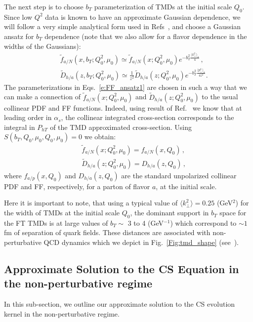 \documentclass[final,3p,times,onecolumn,sort&compress,hidelinks]{elsarticle}
\newcommand{\crd}{\color{red}}
\begin{document}
The next step is to choose $b_T$ parameterization of TMDs at the initial scale $Q_0$.
 Since low $Q^2$ data is known \cite{Schweitzer:2010tt} to have an approximate Gaussian dependence, we will follow a very simple analytical form used in Refs~\cite{Anselmino:2013lza,Signori:2013mda}, and choose a Gaussian ansatz for $b_T$ dependence (note that we also allow for a flavor dependence in the widths of the Gaussians):
\begin{eqnarray}
&&\tilde f_{a/N} (x,b_T; Q_0^2, \mu_0)\simeq  \tilde f_{a/N} (x; Q_0^2, \mu_0) e^{-b_T^2 \frac{\langle k_\perp^2 \rangle_a}{4}}\,,
\nonumber \\[0.3cm]
&&\tilde D_{h/a}(z,b_T; Q_0^2, \mu_0)\simeq \frac{1}{z^2}  \tilde D_{h/a}(z; Q_0^2, \mu_0) e^{-b_T^2 \frac{\langle p_\perp^2 \rangle_a}{4 z^2}}.
\label{e:FF_ansatz1}
\end{eqnarray}
The parameterizations in Eqs.~\eqref{e:FF_ansatz1} are chosen in such a way that we can make a connection of $\tilde f_{a/N} (x; Q_0^2, \mu_0)$ and $\tilde D_{h/a}(z; Q_0^2, \mu_0)$ to the usual collinear PDF and FF functions. Indeed, using result of Ref.~\cite{Collins:2016hqq} we know that at leading order in $\alpha_s$, the collinear integrated cross-section corresponds to the integral in $P_{hT}$ of the TMD approximated cross-section. Using $S(b_T, Q_0, \mu_0, Q_0, \mu_0) = 0$ we obtain:
\begin{eqnarray}
&&\tilde f_{a/N} (x; Q_0^2, \mu_0) = f_{a/N} (x, Q_0)\,,
\\[0.3cm]
&&\tilde D_{h/a}(z; Q_0^2, \mu_0) = D_{h/a}(z, Q_0)\,,
\label{e:FF_ansatz2}
\end{eqnarray}
where $f_{a/p} (x, Q_0)$ and $D_{h/a}(z, Q_0)$ are the standard unpolarized collinear PDF and FF, respectively, for a parton of flavor $a$, at the initial scale.


Here it is important to note, that using a typical value of $\langle k_\perp^2 \rangle = 0.25$ (GeV$^2$) \cite{Anselmino:2005nn} for the width of TMDs at the initial scale $Q_0$, the dominant support in $b_T$ space  for the FT TMDs is at large values of $b_T \sim $ 3 to 4 (GeV$^{-1}$) which correspond to $\sim 1$ fm of separation of quark fields.  These distances are associated with non-perturbative QCD dynamics which we  depict in Fig.~\ref{Fig:tmd_shape}  (see~\cite{Aidala:2014hva}).


\subsection{Approximate Solution to the CS Equation in the non-perturbative regime}
 In this sub-section, we outline our approximate solution to the CS evolution kernel in the non-perturbative regime.
\end{document}
